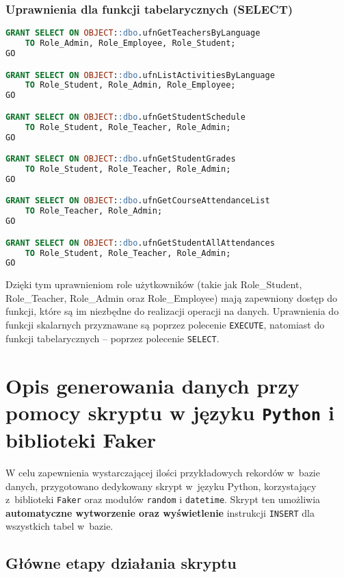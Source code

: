 \documentclass[12pt]{article}
\begin{document}
\subsubsection*{Uprawnienia dla funkcji tabelarycznych (SELECT)}
\begin{lstlisting}[language=SQL]
GRANT SELECT ON OBJECT::dbo.ufnGetTeachersByLanguage
    TO Role_Admin, Role_Employee, Role_Student;
GO

GRANT SELECT ON OBJECT::dbo.ufnListActivitiesByLanguage
    TO Role_Student, Role_Admin, Role_Employee;
GO

GRANT SELECT ON OBJECT::dbo.ufnGetStudentSchedule
    TO Role_Student, Role_Teacher, Role_Admin;
GO

GRANT SELECT ON OBJECT::dbo.ufnGetStudentGrades
    TO Role_Student, Role_Teacher, Role_Admin;
GO

GRANT SELECT ON OBJECT::dbo.ufnGetCourseAttendanceList
    TO Role_Teacher, Role_Admin;
GO

GRANT SELECT ON OBJECT::dbo.ufnGetStudentAllAttendances
    TO Role_Student, Role_Teacher, Role_Admin;
GO
\end{lstlisting}

Dzięki tym uprawnieniom role użytkowników (takie jak Role\_Student, Role\_Teacher, Role\_Admin oraz Role\_Employee) mają zapewniony dostęp do funkcji, które są im niezbędne do realizacji operacji na danych. Uprawnienia do funkcji skalarnych przyznawane są poprzez polecenie \texttt{EXECUTE}, natomiast do funkcji tabelarycznych – poprzez polecenie \texttt{SELECT}.




\newpage
\section{Opis generowania danych przy pomocy skryptu w języku \texttt{Python} i biblioteki {Faker}}
\label{sec:generowanieDanych}

W celu zapewnienia wystarczającej ilości przykładowych rekordów w~bazie danych, przygotowano dedykowany
skrypt w~języku Python, korzystający z~biblioteki \texttt{Faker} oraz modułów \texttt{random} i \texttt{datetime}.
Skrypt ten umożliwia \textbf{automatyczne wytworzenie oraz wyświetlenie} instrukcji \texttt{INSERT} dla
wszystkich tabel w~bazie. 

\subsection{Główne etapy działania skryptu}
\end{document}
